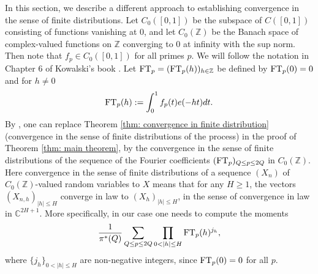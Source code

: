 \documentclass[10pt]{amsart}
\theoremstyle{plain}
\theoremstyle{definition}
\begin{document}
In this section, we describe a different approach to establishing convergence in the sense of finite distributions.
Let $C_0([0,1])$ be the subspace of $C([0,1])$ consisting of functions vanishing at
$0$, and let $C_0(\mathbb{Z})$ be the Banach space of complex-valued functions on
$\mathbb{Z}$ converging to $0$ at infinity with the sup norm. Then note that $f_p\in C_0([0,1])$ for all primes $p$. We will follow the notation in Chapter 6 of Kowalski's book \cite{Ko}.
Let $\textup{FT}_p= (\textup{FT}_p(h))_{h\in \mathbb{Z}}$ be defined by $\textup{FT}_p(0)=0$ and for $h\neq 0$
\[
\textup{FT}_p(h):= \int_0^1 f_p(t) e(-ht)dt. \]
By \cite[Prop.\,B.11.8]{Ko}, one can replace Theorem \ref{thm: convergence in finite distribution} (convergence in the sense of finite distributions of the process) in the proof of Theorem \ref{thm: main theorem}, by the convergence in the sense of finite distributions of the sequence of the Fourier coefficients $(\textup{FT}_p)_{Q\leq p\leq 2Q}$ in $C_0(\mathbb{Z})$. Here convergence in the sense of finite distributions of a sequence $(X_n)$ of $C_0(\mathbb{Z})$-valued random variables to $X$ means that for any $H\geq 1$, the vectors $(X_{n,h})_{|h|\leq H}$ converge in law to $(X_h)_{|h|\leq H}$, in the sense of convergence in law in $\mathbb{C}^{2H+1}$.
More specifically, in our case one needs to compute the moments
\begin{equation}\label{Eq.MomentsFourier}\frac{1}{\pi^*(Q)}\sum_{Q\leq p\leq 2Q} \prod_{0<|h|\leq H}\textup{FT}_p (h)^{j_h},
\end{equation}
where $\{j_h\}_{0<|h|\leq H}$ are non-negative integers, since $\textup{FT}_p(0)=0$ for all $p$.
\end{document}

